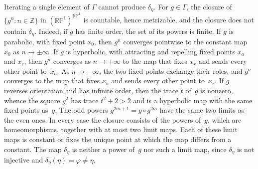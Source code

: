 \documentclass[psamsfonts]{amsart}
\theoremstyle{definition}
\theoremstyle{remark}
\newcommand{\RP}{\mathbb{R}\mathbb{P}}
\numberwithin{equation}{section}
\begin{document}
Iterating a single element of $\Gamma$ cannot produce $\delta_\eta$.
For $g\in\Gamma$, the closure of $\{g^n:n\in\mathbb{Z}\}$ in $(\RP^1)^{\RP^1}$ is
countable, hence metrizable, and the closure does not contain $\delta_\eta$.
Indeed, if $g$ has finite order, the set of its powers is finite.
If $g$ is parabolic, with fixed point $x_0$, then $g^n$ converges pointwise to the constant map $x_0$ as $n\to\pm\infty$.
If $g$ is hyperbolic, with attracting and repelling fixed points $x_a$ and $x_r$, then $g^n$ converges as $n\to+\infty$ to the map that fixes $x_r$ and sends every other point to~$x_a$.
As $n\to-\infty$, the two fixed points exchange their roles, and $g^n$ converges to the map that fixes $x_a$ and sends every other point to~$x_r$.
If $g$ reverses orientation and has infinite order, then the trace $t$ of~$g$ is
nonzero, whence the square $g^2$ has trace $t^2+2>2$ and is a hyperbolic map with the same fixed points as~$g$.
The odd powers $g^{2m+1}=g\circ g^{2m}$ have the same two limits as the even ones.
In every case the closure consists of the powers of~$g$, which are homeomorphisms, together with at most two limit maps.
Each of these limit maps is constant or fixes the unique point at which the map differs from a constant.
The map $\delta_\eta$ is neither a power of~$g$ nor such a limit map, since $\delta_\eta$ is not injective and
$\delta_\eta(\eta)=\varphi\ne\eta$.
\end{document}

